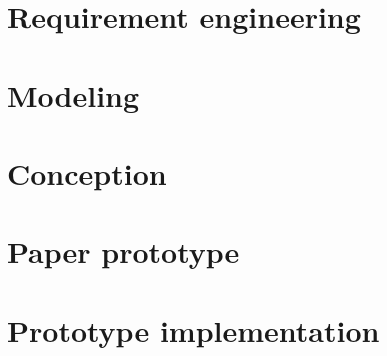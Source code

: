 \documentclass[a4paper,oneside,12pt,titlepage,chapterprefix]{scrreprt}
\begin{document}

	\clearpage
	\setcounter{page}{1}

	

	\chapter{Requirement engineering}\label{chp:ReqE}
	

	\chapter{Modeling}\label{chp:Mod}
		
		
	\chapter{Conception}\label{chp:Conc}
	
	
	\chapter{Paper prototype}\label{chp:PapP}
	
	
	\chapter{Prototype implementation}\label{chp:Prot}
	
	

	\clearpage
	
	
	\clearpage
	\appendix
	
	
	
%	
%	
\end{document}
